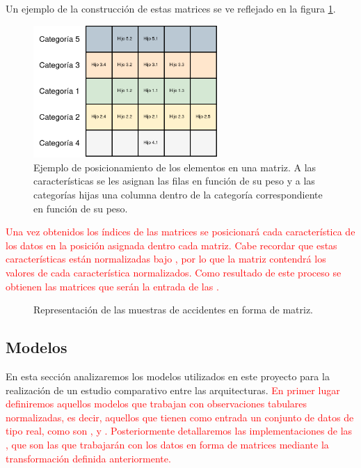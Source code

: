         Un ejemplo de la construcción de estas matrices se ve reflejado en la figura \ref{FV2IExampleImage}.

        \begin{figure}[H]
            \centering
            \includegraphics[width=7cm]{archivos/4.Metodologia/Matrices/FV2I}
            \caption{Ejemplo de posicionamiento de los elementos en una matriz. A las características se les asignan las filas en función de su peso y a las categorías hijas una columna dentro de la categoría correspondiente en función de su peso.}
            \label{FV2IExampleImage}
        \end{figure}

        \textcolor{red}{Una vez obtenidos los índices de las matrices se posicionará cada característica de los datos en la posición asignada dentro cada matriz. Cabe recordar que estas características están normalizadas bajo , por lo que la matriz contendrá los valores de cada característica normalizados. Como resultado de este proceso se obtienen las matrices que serán la entrada de las .}

        \begin{figure}[H]
            \centering
            
            
            

            \caption{Representación de las muestras de accidentes en forma de matriz.}
            \label{SampledImagesExampleImage}
        \end{figure}

    \subsection{Modelos}


        En esta sección analizaremos los modelos utilizados en este proyecto para la realización de un estudio comparativo entre las arquitecturas. \textcolor{red}{En primer lugar definiremos aquellos modelos que trabajan con observaciones tabulares normalizadas, es decir, aquellos que tienen como entrada un conjunto de datos de tipo real, como son ,  y . Posteriormente detallaremos las implementaciones de las , que son las que trabajarán con los datos en forma de matrices mediante la transformación definida anteriormente.}

